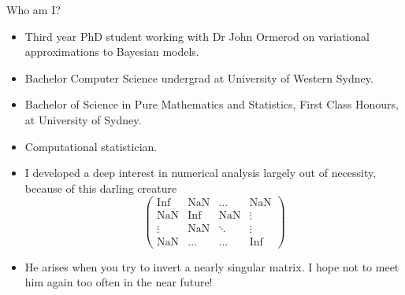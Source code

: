 \documentclass{beamer}
\begin{document}
\begin{frame}{Who am I?}
\begin{itemize}
\item Third year PhD student working with Dr John Ormerod on variational approximations to Bayesian models.
\item Bachelor Computer Science undergrad at University of Western Sydney.
\item Bachelor of Science in Pure Mathematics and Statistics, First Class Honours, at University of Sydney.
\item Computational statistician.
\item I developed a deep interest in numerical analysis largely out of necessity, because of this darling 
creature
\def \Inf {\text{Inf}}
\def \NaN {\text{NaN}}
\begin{equation*}
\begin{pmatrix}
\Inf & \NaN & \ldots & \NaN\\
\NaN & \Inf & \NaN & \vdots \\
\vdots & \NaN & \ddots & \vdots \\
\NaN & \ldots & \ldots & \Inf
\end{pmatrix}
\end{equation*}
\item He arises when you try to invert a nearly singular matrix. I hope not to meet him again too often in 
			the	near future!
\end{itemize}
\end{frame}





\end{document}
